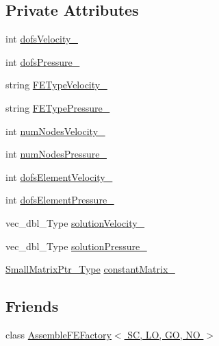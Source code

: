 \subsection*{Private Attributes}
\begin{DoxyCompactItemize}
\item 
int \hyperlink{classFEDD_1_1AssembleFEAceNavierStokes_ab9f645b7c95c753306f55b0719c320c4}{dofs\+Velocity\+\_\+}
\item 
int \hyperlink{classFEDD_1_1AssembleFEAceNavierStokes_abf1541abe26336013363cacacb149443}{dofs\+Pressure\+\_\+}
\item 
string \hyperlink{classFEDD_1_1AssembleFEAceNavierStokes_a1dde809cd07180ecf9533c6de93fa058}{F\+E\+Type\+Velocity\+\_\+}
\item 
string \hyperlink{classFEDD_1_1AssembleFEAceNavierStokes_a96a5a860ce08afa0a42461e446522ace}{F\+E\+Type\+Pressure\+\_\+}
\item 
int \hyperlink{classFEDD_1_1AssembleFEAceNavierStokes_a3a8035f008772690f30636987062d2f9}{num\+Nodes\+Velocity\+\_\+}
\item 
int \hyperlink{classFEDD_1_1AssembleFEAceNavierStokes_a37566d3b2a185a5b83277f811d4697ae}{num\+Nodes\+Pressure\+\_\+}
\item 
int \hyperlink{classFEDD_1_1AssembleFEAceNavierStokes_a5a962e0f07c7887831259dcce56b107c}{dofs\+Element\+Velocity\+\_\+}
\item 
int \hyperlink{classFEDD_1_1AssembleFEAceNavierStokes_a72e23e465ceb18a0dfcd32d42b55aa82}{dofs\+Element\+Pressure\+\_\+}
\item 
vec\+\_\+dbl\+\_\+\+Type \hyperlink{classFEDD_1_1AssembleFEAceNavierStokes_abc56761fd3df5841f8f906d0bdccee16}{solution\+Velocity\+\_\+}
\item 
vec\+\_\+dbl\+\_\+\+Type \hyperlink{classFEDD_1_1AssembleFEAceNavierStokes_ab1e3da8b5d59c7a335906aa6415038ff}{solution\+Pressure\+\_\+}
\item 
\hyperlink{classFEDD_1_1AssembleFE_afb5fb5dca3aab59f697a25884e99e894}{Small\+Matrix\+Ptr\+\_\+\+Type} \hyperlink{classFEDD_1_1AssembleFEAceNavierStokes_ab01d80895373d7bd7e394182d40da8d3}{constant\+Matrix\+\_\+}
\end{DoxyCompactItemize}
\subsection*{Friends}
\begin{DoxyCompactItemize}
\item 
class \hyperlink{classFEDD_1_1AssembleFEAceNavierStokes_a30ff0dcd1d500892033fc319deacb8fb}{Assemble\+F\+E\+Factory$<$ S\+C, L\+O, G\+O, N\+O $>$}
\end{DoxyCompactItemize}
